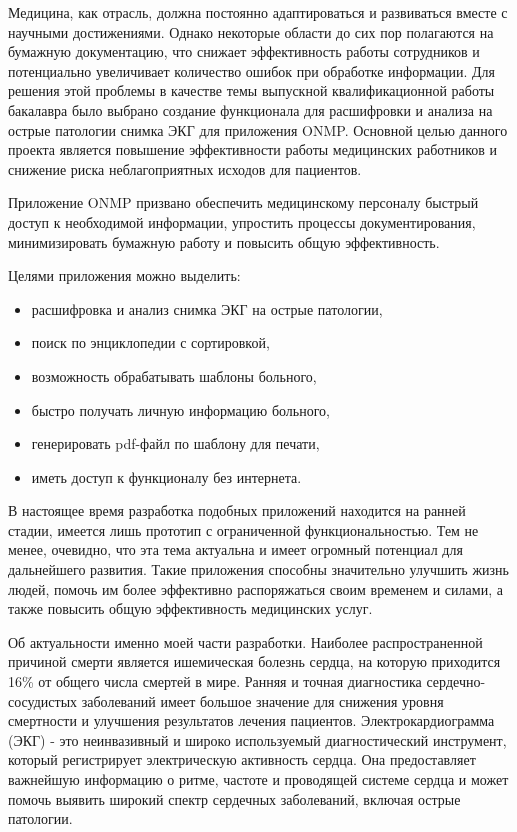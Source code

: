 \introduction %
Медицина, как отрасль, должна постоянно адаптироваться и развиваться вместе с научными достижениями. Однако некоторые области до сих пор полагаются на бумажную документацию, что снижает эффективность работы сотрудников и потенциально увеличивает количество ошибок при обработке информации. Для решения этой проблемы в качестве темы выпускной квалификационной работы бакалавра было выбрано создание функционала для расшифровки и анализа на острые патологии снимка ЭКГ для приложения ONMP. Основной целью данного проекта является повышение эффективности работы медицинских работников и снижение риска неблагоприятных исходов для пациентов.

Приложение ONMP призвано обеспечить медицинскому персоналу быстрый доступ к необходимой информации, упростить процессы документирования, минимизировать бумажную работу и повысить общую эффективность.

Целями приложения можно выделить: 
\begin{itemize}
    \item расшифровка и анализ снимка ЭКГ на острые патологии,
    \item поиск по энциклопедии с сортировкой,
    \item возможность обрабатывать шаблоны больного,
    \item быстро получать личную информацию больного,
    \item генерировать pdf-файл по шаблону для печати,
    \item иметь доступ к функционалу без интернета.
\end{itemize}

В настоящее время разработка подобных приложений находится на ранней стадии, имеется лишь прототип с ограниченной функциональностью. Тем не менее, очевидно, что эта тема актуальна и имеет огромный потенциал для дальнейшего развития. Такие приложения способны значительно улучшить жизнь людей, помочь им более эффективно распоряжаться своим временем и силами, а также повысить общую эффективность медицинских услуг.

Об актуальности именно моей части разработки.
Наиболее распространенной причиной смерти является ишемическая болезнь сердца, на которую приходится 16\% от общего числа смертей в мире. Ранняя и точная диагностика сердечно-сосудистых заболеваний имеет большое значение для снижения уровня смертности и улучшения результатов лечения пациентов. Электрокардиограмма (ЭКГ) - это неинвазивный и широко используемый диагностический инструмент, который регистрирует электрическую активность сердца. Она предоставляет важнейшую информацию о ритме, частоте и проводящей системе сердца и может помочь выявить широкий спектр сердечных заболеваний, включая острые патологии.

